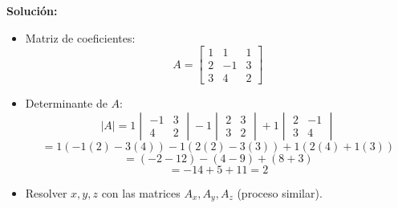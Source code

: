 \documentclass{profesor}
\begin{document}
\textbf{Solución:}  
\begin{itemize}
    \item Matriz de coeficientes:
    \[
    A =
    \begin{bmatrix}
    1 & 1 & 1 \\
    2 & -1 & 3 \\
    3 & 4 & 2
    \end{bmatrix}
    \]
    \item Determinante de \( A \):
    \[
    |A| =
    1\begin{vmatrix}-1 & 3 \\ 4 & 2\end{vmatrix}
    - 1\begin{vmatrix}2 & 3 \\ 3 & 2\end{vmatrix}
    + 1\begin{vmatrix}2 & -1 \\ 3 & 4\end{vmatrix}
    \]
    \[
    = 1(-1(2) - 3(4)) - 1(2(2) - 3(3)) + 1(2(4) + 1(3))
    \]
    \[
    = ( -2 - 12 ) - ( 4 - 9 ) + ( 8 + 3 )
    \]
    \[
    = -14 + 5 + 11 = 2
    \]
    \item Resolver \( x, y, z \) con las matrices \( A_x, A_y, A_z \) (proceso similar).  
\end{itemize}
\end{document}
